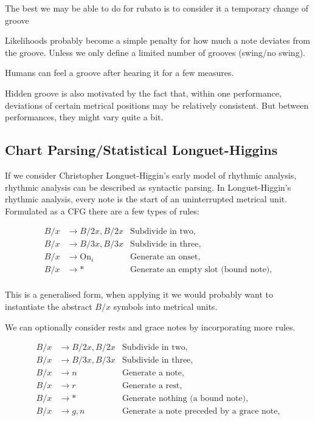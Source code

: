 \documentclass[a4paper,10pt]{article}
\begin{document}
The best we may be able to do for rubato is to consider it a temporary change of groove

Likelihoods probably become a simple penalty for how much a note deviates from the groove. Unless we only define a limited number of grooves (swing/no swing).

Humans can feel a groove after hearing it for a few measures.

Hidden groove is also motivated by the fact that, within one performance, deviations of certain metrical positions may be relatively consistent. But between performances, they might vary quite a bit.
\subsection{Chart Parsing/Statistical Longuet-Higgins}

\label{sec:chart}

If we consider Christopher Longuet-Higgin's early model of rhythmic analysis, rhythmic analysis can be described as syntactic parsing. In Longuet-Higgin's rhythmic analysis, every note is the start of an uninterrupted metrical unit. Formulated as a CFG there are a few types of rules:


\begin{align}
\label{eq:grammar}
B/x &\rightarrow B/2x, B/2x&\textrm{Subdivide in two,}\\
B/x &\rightarrow B/3x, B/3x & \textrm{Subdivide in three,}\\
B/x &\rightarrow \textrm{On}_i & \textrm{Generate an onset,}\\
B/x &\rightarrow * & \textrm{Generate an empty slot (bound note),}\\
\end{align}

This is a generalised form, when applying it we would probably want to instantiate the abstract $B/x$ symbols into metrical units.

We can optionally consider rests and grace notes by incorporating more rules.

\begin{align*}
B/x &\rightarrow B/2x, B/2x&\textrm{Subdivide in two,}\\
B/x &\rightarrow B/3x, B/3x & \textrm{Subdivide in three,}\\
B/x &\rightarrow n & \textrm{Generate a note,}\\
B/x &\rightarrow r & \textrm{Generate a rest,}\\
B/x &\rightarrow * & \textrm{Generate nothing (a bound note),}\\
B/x &\rightarrow g, n & \textrm{Generate a note preceded by a grace note,}\\
\end{align*}
\end{document}
